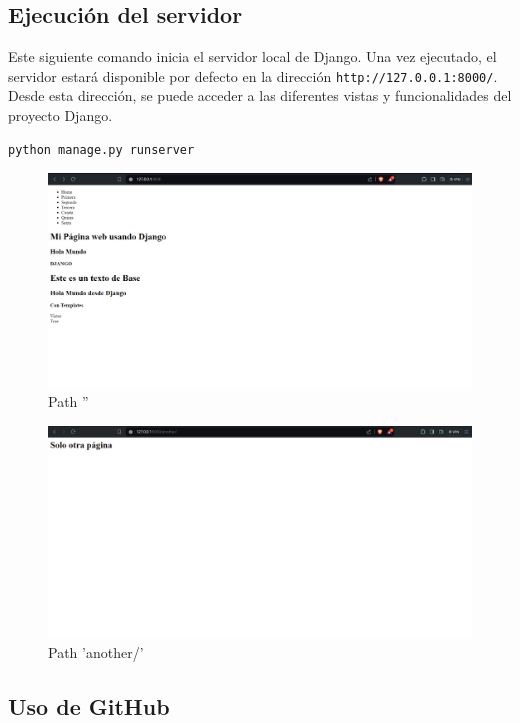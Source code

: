 \documentclass{article}
\begin{document}
  \subsection{Ejecución del servidor}
  Este siguiente comando inicia el servidor local de Django. Una vez ejecutado, el servidor estará disponible por defecto en la dirección 
  \texttt{http://127.0.0.1:8000/}. Desde esta dirección, se puede acceder a las diferentes vistas y funcionalidades del 
  proyecto Django.
  \begin{lstlisting}[language=bash]
    python manage.py runserver
  \end{lstlisting}
  \begin{figure}[H]
    \centering
    \includegraphics[width=1\textwidth, keepaspectratio]{img/ejecucion1.png}
    \caption{Path ''}
  \end{figure}
  \begin{figure}[H]
    \centering
    \includegraphics[width=1\textwidth, keepaspectratio]{img/ejecucion2.png}
    \caption{Path 'another/'}
  \end{figure}


	
  \subsection{Uso de GitHub}
  
\end{document}
